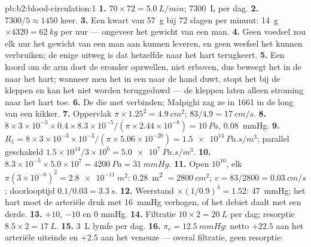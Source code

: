 \begin{solution}{pb:b2:blood-circulation:1}
\textbf{1.} $70\times 72 = \qty{5.0}{L/min}$; \qty{7300}{L} per dag.
\textbf{2.} $7300/5 \approx 1450$ keer.
\textbf{3.} Een kwart van \qty{57}{g} bij 72 slagen per minuut: \qty{14}{g}
$\times 4320 = \qty{62}{kg}$ per uur --- ongeveer het gewicht van een man.
\textbf{4.} Geen voedsel zou elk uur het gewicht van een man aan  kunnen
leveren, en geen weefsel het kunnen verbruiken; de enige uitweg is dat
hetzelfde  naar het hart terugkeert.
\textbf{5.} Een koord om de arm doet de  eronder opzwellen, niet
erboven, dus beweegt het  in de  naar het hart; wanneer men het
 in een  naar de hand duwt, stopt het bij de kleppen en kan het
niet worden teruggeduwd --- de kleppen laten alleen stroming naar het hart
toe.
\textbf{6.} De  die  met  verbinden; Malpighi zag ze
in 1661 in de long van een kikker.
\textbf{7.} Oppervlak $\pi\times 1.25^{2} = \qty{4.9}{cm^2}$; $83/4.9 =
\qty{17}{cm/s}$.
\textbf{8.} $8\times 3\times 10^{-3}\times 0.4\times 8.3\times
10^{-5}/(\pi\times 2.44\times 10^{-8}) = \qty{10}{Pa}$, \qty{0.08}{mmHg}.
\textbf{9.} $R_{1} = 8\times 3\times 10^{-3}\times 10^{-3}/(\pi\times
5.06\times 10^{-20}) = \qty{1.5e14}{Pa.s/m^3}$; parallel geschakeld
$1.5\times 10^{14}/3\times 10^{6} = \qty{5.0e7}{Pa.s/m^3}$.
\textbf{10.} $8.3\times 10^{-5}\times 5.0\times 10^{7} = \qty{4200}{Pa}
= \qty{31}{mmHg}$.
\textbf{11.} Open  $10^{10}$, elk $\pi(3\times 10^{-6})^{2}
= \qty{2.8e-11}{m^2}$: \qty{0.28}{m^2} $= \qty{2800}{cm^2}$; $v =
83/2800 = \qty{0.03}{cm/s}$; doorlooptijd $0.1/0.03 = \qty{3.3}{s}$.
\textbf{12.} Weerstand $\times(1/0.9)^{4} = 1.52$: \qty{47}{mmHg}; het hart
moet de arteriële druk met \qty{16}{mmHg} verhogen, of het debiet daalt met
een derde.
\textbf{13.} $+10$, $-10$ en $0$ mmHg.
\textbf{14.} Filtratie $10\times 2 = \qty{20}{L}$ per dag; resorptie
$8.5\times 2 = \qty{17}{L}$.
\textbf{15.} \qty{3}{L} lymfe per dag.
\textbf{16.} $\pi_c = \qty{12.5}{mmHg}$: netto $+22.5$ aan het arteriële
uiteinde en $+2.5$ aan het veneuze --- overal filtratie, geen resorptie:

\end{solution}
